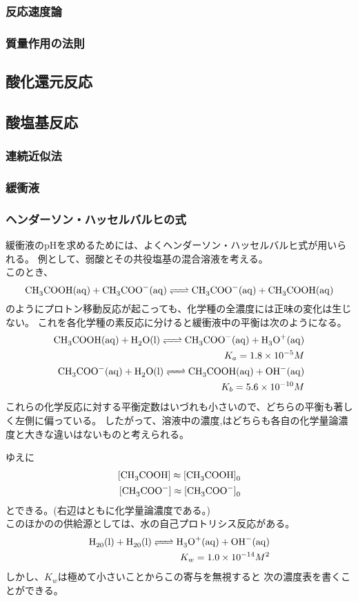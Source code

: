 \documentclass[dvipdfmx,uplatex]{jsarticle}
\begin{document}
	\subsubsection{反応速度論}
	\subsubsection{質量作用の法則}

\subsection{酸化還元反応}
\subsection{酸塩基反応}
	\subsubsection{連続近似法}
	\subsubsection{緩衝液}
	\subsubsection{ヘンダーソン・ハッセルバルヒの式}
緩衝液のpHを求めるためには、よくヘンダーソン・ハッセルバルヒ式が用いられる。
例として、弱酸とその共役塩基の混合溶液を考える。 \\
このとき、
\[
\ce{CH3COOH(aq) + CH3COO- (aq) <=> CH3COO- (aq) + CH3COOH(aq)}
\]
のようにプロトン移動反応が起こっても、化学種の全濃度には正味の変化は生じない。
これを各化学種の素反応に分けると緩衝液中の平衡は次のようになる。
\begin{align*}
\ce{CH3COOH(aq) + H2O(l) <=> CH3COO- (aq) + H3O+(aq)} \\
K_a = 1.8 \times 10^{-5} M \\
\ce{CH3COO- (aq) + H2O(l) <=> CH3COOH(aq) + OH- (aq)} \\
K_b = 5.6 \times 10^{-10} M
\end{align*}
これらの化学反応に対する平衡定数はいづれも小さいので、どちらの平衡も著しく左側に偏っている。
したがって、溶液中の濃度\ce{[CH3COOH]},\ce{[CH3COO- ]}はどちらも各自の化学量論濃度と大きな違いはないものと考えられる。

ゆえに
\begin{align*}
\ce{[CH3COOH] \approx [CH3COOH]0} \\
\ce{[CH3COO- ] \approx [CH3COO- ]0} \\
\end{align*}
とできる。(右辺はともに化学量論濃度である。) \\
このほかのの供給源としては、水の自己プロトリシス反応がある。 \\
\begin{align*}
\ce{H20(l) + H20(l) <=> H3O+(aq) + OH- (aq)} \\
K_w = 1.0 \times 10^{-14} M^2 \\
\end{align*}
しかし、$K_w$は極めて小さいことからこの寄与を無視すると
次の濃度表を書くことができる。 \\
\end{document}
